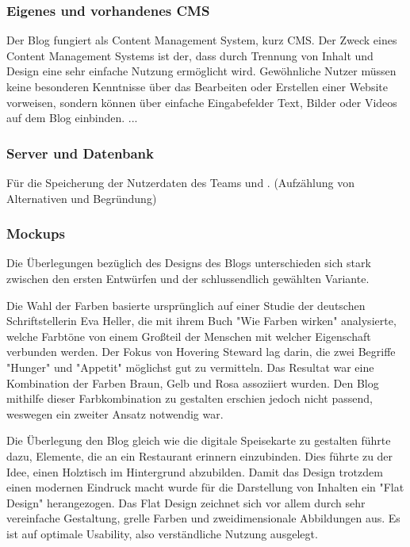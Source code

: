     \subsubsection{Eigenes und vorhandenes CMS}
    Der Blog fungiert als Content Management System, kurz CMS. Der Zweck eines
    Content Management Systems ist der, dass durch Trennung von Inhalt und Design eine
    sehr einfache Nutzung ermöglicht wird. Gewöhnliche Nutzer müssen keine besonderen
    Kenntnisse über das Bearbeiten oder Erstellen einer Website vorweisen, sondern
    können über einfache Eingabefelder Text, Bilder oder Videos auf dem Blog einbinden.
    ...

    \subsubsection{Server und Datenbank}


    Für die Speicherung der Nutzerdaten des Teams und . (Aufzählung von Alternativen und Begründung)

    \subsubsection{Mockups}
    Die Überlegungen bezüglich des Designs des Blogs unterschieden sich stark zwischen den ersten
    Entwürfen und der schlussendlich gewählten Variante.

    Die Wahl der Farben basierte ursprünglich auf einer Studie der deutschen Schriftstellerin Eva Heller,
    die mit ihrem Buch "Wie Farben wirken" analysierte, welche Farbtöne von einem Großteil der Menschen
    mit welcher Eigenschaft verbunden werden. Der Fokus von Hovering Steward lag darin, die zwei Begriffe {"Hunger"\cite{WieFarbenWirken}}
    und "Appetit" möglichst gut zu vermitteln. Das Resultat war eine Kombination der Farben Braun, Gelb und Rosa
    assoziiert wurden. Den Blog mithilfe dieser Farbkombination zu gestalten erschien jedoch nicht passend, weswegen
    ein zweiter Ansatz notwendig war.

    Die Überlegung den Blog gleich wie die digitale Speisekarte zu gestalten führte dazu, Elemente, die an ein Restaurant
    erinnern einzubinden. Dies führte zu der Idee, einen Holztisch im Hintergrund abzubilden.
    Damit das Design trotzdem einen modernen Eindruck macht wurde für die Darstellung von Inhalten ein {"Flat Design"\cite{FlatDesign}}
    herangezogen. Das Flat Design zeichnet sich vor allem durch sehr vereinfache Gestaltung, grelle Farben und zweidimensionale Abbildungen aus.
    Es ist auf optimale Usability, also verständliche Nutzung ausgelegt.

